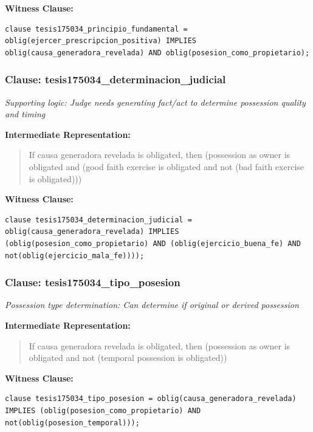 \documentclass[11pt,a4paper]{article}
\begin{document}
\textbf{Witness Clause:}

\begin{lstlisting}[style=witnessstyle, language=Witness]
clause tesis175034_principio_fundamental = oblig(ejercer_prescripcion_positiva) IMPLIES oblig(causa_generadora_revelada) AND oblig(posesion_como_propietario);
\end{lstlisting}

\subsubsection{Clause: tesis175034\_determinacion\_judicial}

\textit{Supporting logic: Judge needs generating fact/act to determine possession quality and timing}

\textbf{Intermediate Representation:}

\begin{quote}
If causa generadora revelada is obligated, then (possession as owner is obligated and (good faith exercise is obligated and not (bad faith exercise is obligated)))
\end{quote}

\textbf{Witness Clause:}

\begin{lstlisting}[style=witnessstyle, language=Witness]
clause tesis175034_determinacion_judicial = oblig(causa_generadora_revelada) IMPLIES (oblig(posesion_como_propietario) AND (oblig(ejercicio_buena_fe) AND not(oblig(ejercicio_mala_fe))));
\end{lstlisting}

\subsubsection{Clause: tesis175034\_tipo\_posesion}

\textit{Possession type determination: Can determine if original or derived possession}

\textbf{Intermediate Representation:}

\begin{quote}
If causa generadora revelada is obligated, then (possession as owner is obligated and not (temporal possession is obligated))
\end{quote}

\textbf{Witness Clause:}

\begin{lstlisting}[style=witnessstyle, language=Witness]
clause tesis175034_tipo_posesion = oblig(causa_generadora_revelada) IMPLIES (oblig(posesion_como_propietario) AND not(oblig(posesion_temporal)));
\end{lstlisting}
\end{document}
